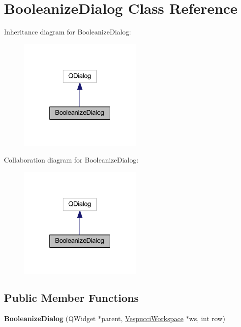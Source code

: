 \hypertarget{class_booleanize_dialog}{\section{Booleanize\+Dialog Class Reference}
\label{class_booleanize_dialog}
}


Inheritance diagram for Booleanize\+Dialog\+:\nopagebreak
\begin{figure}[H]
\begin{center}
\leavevmode
\includegraphics[width=172pt]{class_booleanize_dialog__inherit__graph}
\end{center}
\end{figure}


Collaboration diagram for Booleanize\+Dialog\+:\nopagebreak
\begin{figure}[H]
\begin{center}
\leavevmode
\includegraphics[width=172pt]{class_booleanize_dialog__coll__graph}
\end{center}
\end{figure}
\subsection*{Public Member Functions}
\begin{DoxyCompactItemize}
\item 
\hypertarget{class_booleanize_dialog_aae68d3541d225de9c90c8f5a128c7027}{{\bfseries Booleanize\+Dialog} (Q\+Widget $\ast$parent, \hyperlink{class_vespucci_workspace}{Vespucci\+Workspace} $\ast$ws, int row)}\label{class_booleanize_dialog_aae68d3541d225de9c90c8f5a128c7027}

\end{DoxyCompactItemize}


